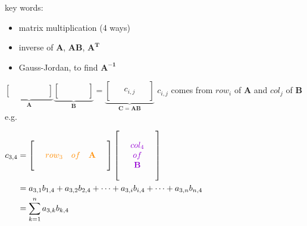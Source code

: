 \documentclass[12pt, a4paper]{article}
\begin{document}
\noindent
key words:
\begin{itemize}
	\item matrix multiplication (4 ways)
	\item inverse of ${\mathbf{A}}$, ${\mathbf{AB}}$, ${\mathbf{A^{T}}}$
	\item Gauss-Jordan, to find ${\mathbf{A^{-1}}}$
\end{itemize}
\vspace{14pt}
\begin{math}
	\underbrace{
		\begin{bmatrix}
			\ \ & \ & \ & \ \ \\
			\ \ & \ & \ & \ \ \\
			\ \ & \ & \ & \ \ 
		\end{bmatrix}
	}_{\mathbf{A}}
	\underbrace{
		\begin{bmatrix}
			\ \ & \ & \ \ \\
			\ \ & \ & \ \ \\
			\ \ & \ & \ \ \\
			\ \ & \ & \ \ 
		\end{bmatrix}
	}_{\mathbf{B}}
	 = 
	\underbrace{
		\begin{bmatrix}
			\ \ & \ & \ \ \\
			\ \ & c_{i,j} & \ \ \\
			\ \ & \ & \ \ 
		\end{bmatrix}
	}_{\mathbf{C=AB}}
\end{math}
\newline
$c_{i,j}$ comes from $row_i$ of ${\mathbf{A}}$ and $col_j$ of ${\mathbf{B}}$
\newline
e.g.
\par 
\begin{math}
	\begin{aligned}
		c_{3,4} &= 
		\begin{bmatrix}
			\ & \ & \ & \ & \ \\
			\ & {\textcolor{anhao-orange}{row_3}} & {\textcolor{anhao-orange}{of}} & {\textcolor{anhao-orange}{\mathbf{A}}} & \ \\
			\ & \ & \ & \ & \ 
		\end{bmatrix}
		\begin{bmatrix}
			\ & \ & \ \\
			\ & {\textcolor{anhao-purple}{col_4}} & \ \\
			\ & {\textcolor{anhao-purple}{of}} & \ \\
			\ & {\textcolor{anhao-purple}{\mathbf{B}}} & \ \\
			\ & \ & \
		\end{bmatrix} \\
				&= a_{3,1}b_{1,4} + a_{3,2}b_{2,4} + \cdots + a_{3,i}b_{i,4} + \cdots + a_{3,n}b_{n,4} \\
				&= \sum_{k=1}^{n}a_{3,k}b_{k,4}
	\end{aligned}
\end{math}
\end{document}
